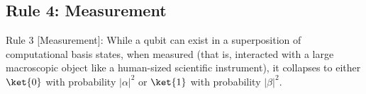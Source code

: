\subsection{Rule 4: Measurement}

\begin{definition}
Rule 3 [Measurement]: While a qubit can exist in a superposition
of computational basis states, when measured (that is, interacted with a
large macroscopic object like a human-sized scientific instrument), it
collapses to either $\ket{0}$ with probability $|\alpha|^2$ or
$\ket{1}$ with probability $|\beta|^2$.
\end{definition}

